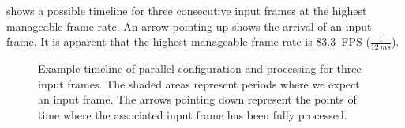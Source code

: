  shows a possible timeline for three consecutive input frames at the highest manageable frame rate.
An arrow pointing up shows the arrival of an input frame.
It is apparent that the highest manageable frame rate is \SI{83.3}{FPS} ($\frac{1}{\SI{12}{ms}}$).

\begin{figure}[hbtp]
    \centering
    \resizebox{0.8\linewidth}{!}{
        
    }
    \caption{
    Example timeline of parallel configuration and processing for three input frames.
    The shaded areas represent periods where we expect an input frame.
    The arrows pointing down represent the points of time where the associated input frame has been fully processed.
    }
    \label{fig:schedule_parallel_configuration_extended}
\end{figure}

